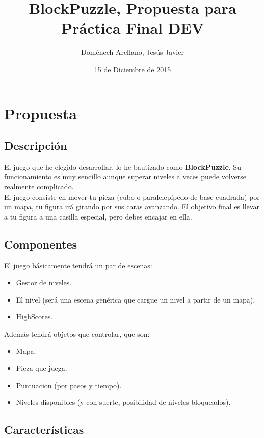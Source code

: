 \documentclass[11pt]{article}
\title{BlockPuzzle, Propuesta para Práctica Final DEV}
\author{Doménech Arellano, Jesús Javier}
\date{15 de Diciembre de 2015}
\begin{document}
\maketitle

\setcounter{tocdepth}{3}
\tableofcontents
\vspace*{1cm}

\section{Propuesta}
\label{sec-1}
\subsection{Descripción}
\label{sec-1-1}


  El juego que he elegido desarrollar, lo he bautizado como
  \textbf{BlockPuzzle}. Su funcionamiento es muy sencillo aunque
  superar niveles a veces puede volverse realmente complicado.\\

  El juego consiste en mover tu pieza (cubo o paralelepípedo de base
  cuadrada) por un mapa, tu figura irá girando por sus caras
  avanzando. El objetivo final es llevar a tu figura a una casilla
  especial, pero debes encajar en ella.
\subsection{Componentes}
\label{sec-1-2}

   El juego básicamente tendrá un par de escenas:
\begin{itemize}
\item Gestor de niveles.
\item El nivel (será una escena genérica que cargue un nivel a partir
     de un mapa).
\item HighScores.
\end{itemize}
   Además tendrá objetos que controlar, que son:
\begin{itemize}
\item Mapa.
\item Pieza que juega.
\item Puntuacion (por pasos y tiempo).
\item Niveles disponibles (y con suerte, posibilidad de niveles
     bloqueados).
\end{itemize}
\subsection{Características}
\label{sec-1-3}
\end{document}
